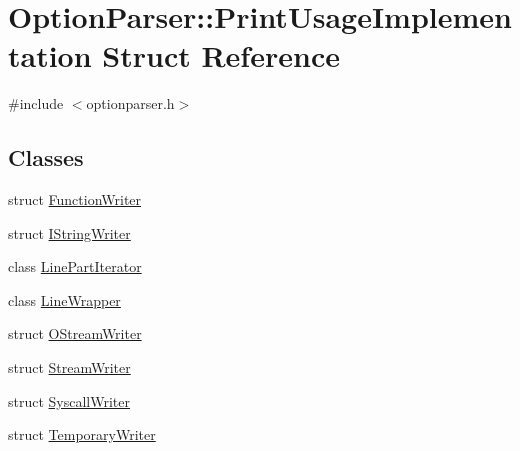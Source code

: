 \hypertarget{struct_option_parser_1_1_print_usage_implementation}{\section{Option\-Parser\-:\-:Print\-Usage\-Implementation Struct Reference}
\label{struct_option_parser_1_1_print_usage_implementation}
}


{\ttfamily \#include $<$optionparser.\-h$>$}

\subsection*{Classes}
\begin{DoxyCompactItemize}
\item 
struct \hyperlink{struct_option_parser_1_1_print_usage_implementation_1_1_function_writer}{Function\-Writer}
\item 
struct \hyperlink{struct_option_parser_1_1_print_usage_implementation_1_1_i_string_writer}{I\-String\-Writer}
\item 
class \hyperlink{class_option_parser_1_1_print_usage_implementation_1_1_line_part_iterator}{Line\-Part\-Iterator}
\item 
class \hyperlink{class_option_parser_1_1_print_usage_implementation_1_1_line_wrapper}{Line\-Wrapper}
\item 
struct \hyperlink{struct_option_parser_1_1_print_usage_implementation_1_1_o_stream_writer}{O\-Stream\-Writer}
\item 
struct \hyperlink{struct_option_parser_1_1_print_usage_implementation_1_1_stream_writer}{Stream\-Writer}
\item 
struct \hyperlink{struct_option_parser_1_1_print_usage_implementation_1_1_syscall_writer}{Syscall\-Writer}
\item 
struct \hyperlink{struct_option_parser_1_1_print_usage_implementation_1_1_temporary_writer}{Temporary\-Writer}
\end{DoxyCompactItemize}
